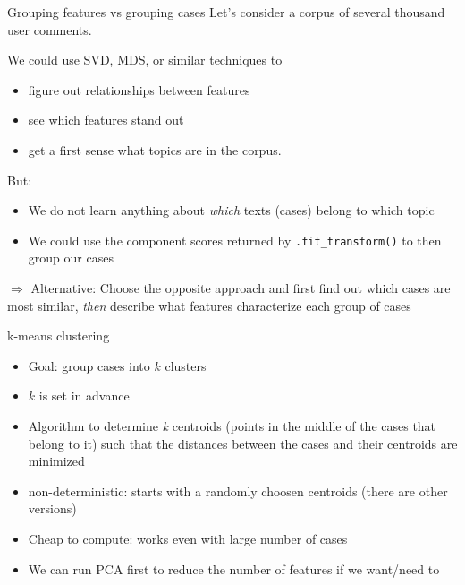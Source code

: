 \documentclass[compress]{beamer}
\begin{document}
\begin{frame}{Grouping features vs grouping cases}
Let's consider a corpus of several thousand user comments.

We could use SVD, MDS, or similar techniques to 
\begin{itemize}
\item figure out relationships between features
\item see which features stand out
\item get a first sense what topics are in the corpus.
\end{itemize}
\pause

But:
\begin{itemize}
\item<+-> We do not learn anything about \emph{which} texts (cases) belong to which topic
\item<+-> We could use the component scores returned by \texttt{.fit\_transform()} to then group our cases
\end{itemize}

\pause 
$\Rightarrow$ \footnotesize{Alternative: Choose the opposite approach and first find out which cases are most similar, \textit{then} describe what features characterize each group of cases}


\end{frame}




\begin{frame}{k-means clustering}
\begin{itemize}[<+->]
\item Goal: group cases into $k$ clusters
\item $k$ is set in advance
\item Algorithm to determine \textit{k} centroids (points in the middle of the cases that belong to it) such that the distances between the cases and their centroids are minimized
\item non-deterministic: starts with a randomly choosen centroids (there are other versions)
\item Cheap to compute: works even with large number of cases
\item We can run PCA first to reduce the number of features if we want/need to
\end{itemize}
\end{frame}
\end{document}

